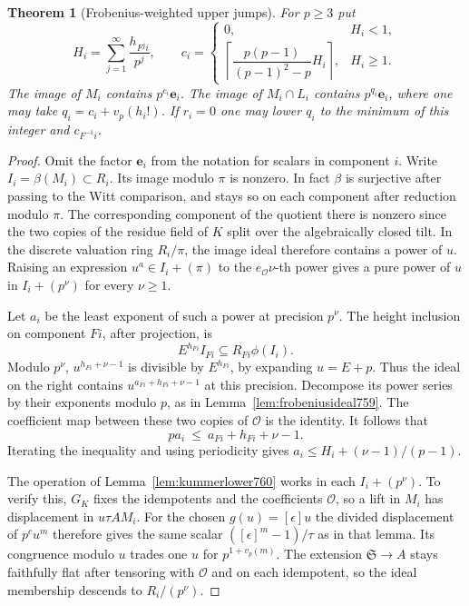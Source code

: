 \documentclass[a4paper,11pt]{article}
\newtheorem{theorem}[proposition]{Theorem}
\theoremstyle{definition}
\theoremstyle{remark}
\numberwithin{equation}{section}
\begin{document}
\begin{theorem}[Frobenius-weighted upper jumps]
\leavevmode\label{thm:orbitlift764}
For \(p\ge3\) put
\[
       H_i=\sum_{j=1}^{\infty}\frac{h_{F^ji}}{p^j},\qquad
       c_i=
       \begin{cases}
       0,&H_i<1,\\[2pt]
       \left\lceil\dfrac{p(p-1)}{(p-1)^2-p}H_i\right\rceil,&H_i\ge1 .
       \end{cases}
\]
The image of \(M_i\) contains \(p^{c_i}\mathbf e_i\).
The image of \(M_i\cap L_i\) contains \(p^{q_i}\mathbf e_i\),
where one may take \(q_i=c_i+v_p(h_i!)\). If \(r_i=0\)
one may lower \(q_i\) to the minimum of this integer and
\(c_{F^{-1}i}\).
\end{theorem}
\begin{proof}
Omit the factor \(\mathbf e_i\) from the notation for scalars
in component \(i\). Write \(I_i=\beta(M_i)\subset R_i\).
Its image modulo \(\pi\) is nonzero. In fact \(\beta\) is
surjective after passing to the Witt comparison, and stays
so on each component after reduction modulo \(\pi\). The
corresponding component of the quotient there is nonzero
since the two copies of the residue field of \(K\) split
over the algebraically closed tilt. In the discrete valuation
ring \(R_i/\pi\), the image ideal therefore contains a
power of \(u\). Raising an expression \(u^a\in I_i+(\pi)\)
to the \(e_{\mathcal O}\nu\)-th power gives a pure power of
\(u\) in \(I_i+(p^\nu)\) for every \(\nu\ge1\).

Let \(a_i\) be the least exponent of such a power at
precision \(p^\nu\). The height inclusion on component
\(F i\), after projection, is
\[
          E^{h_{F i}}I_{F i}\subseteq R_{F i}\phi(I_i).
\]
Modulo \(p^\nu\), \(u^{h_{F i}+\nu-1}\) is divisible by
\(E^{h_{F i}}\), by expanding \(u=E+p\). Thus the ideal
on the right contains \(u^{a_{F i}+h_{F i}+\nu-1}\)
at this precision. Decompose its power series by their
exponents modulo \(p\), as in Lemma~\ref{lem:frobeniusideal759}.
The coefficient map between these two copies of \(\mathcal O\)
is the identity. It follows that
\[
                 p a_i\ \le\ a_{F i}+h_{F i}+\nu-1 .
\]
Iterating the inequality and using periodicity gives
\(a_i\le H_i+(\nu-1)/(p-1)\).

The operation of Lemma~\ref{lem:kummerlower760} works in
each \(I_i+(p^\nu)\). To verify this, \(G_K\) fixes the
idempotents and the coefficients \(\mathcal O\), so a lift
in \(M_i\) has displacement in \(u\tau A M_i\). For
the chosen \(g(u)=[\epsilon]u\) the divided displacement
of \(p^c u^m\) therefore gives the same scalar
\(([\epsilon]^m-1)/\tau\) as in that lemma. Its congruence
modulo \(u\) trades one \(u\) for \(p^{1+v_p(m)}\).
The extension \(\mathfrak S\to A\) stays faithfully flat
after tensoring with \(\mathcal O\) and on each idempotent,
so the ideal membership descends to \(R_i/(p^\nu)\).


\end{proof}
\end{document}
